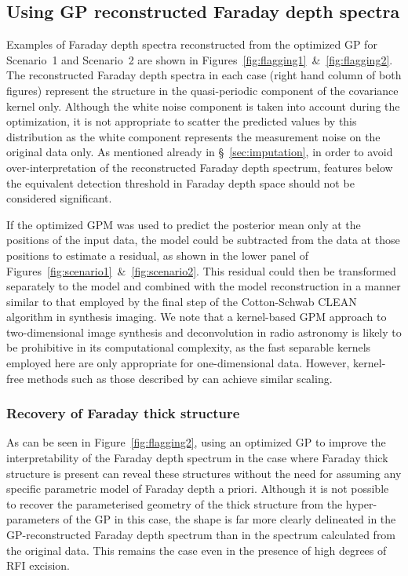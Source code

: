 \documentclass[fleqn,usenatbib]{mnras}
\begin{document}
\subsection{Using GP reconstructed Faraday depth spectra}
\label{sec:usage}

Examples of Faraday depth spectra reconstructed from the optimized GP for Scenario~1 and Scenario~2 are shown in Figures~\ref{fig:flagging1}~\&~\ref{fig:flagging2}. The reconstructed Faraday depth spectra in each case (right hand column of both figures) represent the structure in the quasi-periodic component of the covariance kernel only. Although the white noise component is taken into account during the optimization, it is not appropriate to scatter the predicted values by this distribution as the white component represents the measurement noise on the original data only. As mentioned already in \S~\ref{sec:imputation}, in order to avoid over-interpretation of the reconstructed Faraday depth spectrum, features below the equivalent detection threshold in Faraday depth space should not be considered significant.

If the optimized GPM was used to predict the posterior mean only at the positions of the input data, the model could be subtracted from the data at those positions to estimate a residual, as shown in the lower panel of Figures~\ref{fig:scenario1}~\&~\ref{fig:scenario2}. This residual could then be transformed separately to the model and combined with the model reconstruction in a manner similar to that employed by the final step of the Cotton-Schwab CLEAN algorithm in synthesis imaging. We note that a kernel-based GPM approach to two-dimensional image synthesis and deconvolution in radio astronomy is likely to be prohibitive in its computational complexity, as the fast separable kernels employed here are only appropriate for one-dimensional data. However, kernel-free methods such as those described by \cite{arras2020} can achieve similar scaling. 

\subsubsection{Recovery of Faraday thick structure}
\label{sec:thick}

As can be seen in Figure~\ref{fig:flagging2}, using an optimized GP to improve the interpretability of the Faraday depth spectrum in the case where Faraday thick structure is present can reveal these structures without the need for assuming any specific parametric model of Faraday depth a priori. Although it is not possible to recover the parameterised geometry of the thick structure from the hyper-parameters of the GP in this case, the shape is far more clearly delineated in the GP-reconstructed Faraday depth spectrum than in the spectrum calculated from the original data. This remains the case even in the presence of high degrees of RFI excision.
\end{document}
